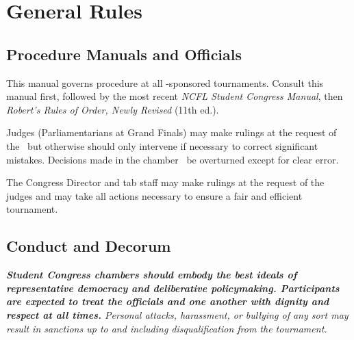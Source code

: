 \section{General Rules}


\subsection{Procedure Manuals and Officials}\label{manuals}

This manual governs procedure at all \FGCCFL-sponsored tournaments. 
Consult this manual first, 
followed by the most recent \emph{NCFL Student Congress Manual}, 
then \emph{Robert's Rules of Order, Newly Revised} (11th ed.).

Judges (Parliamentarians at Grand Finals) may make rulings at the request of the \po\ 
but otherwise should only intervene if necessary to correct significant mistakes. 
Decisions made in the chamber \willnot\ be overturned except for clear error.

The Congress Director and tab staff may make rulings at the request of the judges 
and may take all actions necessary to ensure a fair and efficient tournament.


\subsection{Conduct and Decorum}\label{conduct}

\textit{\textbf{Student Congress chambers should embody the best ideals of 
representative democracy and deliberative policymaking. 
Participants are expected to treat the officials and one another 
with dignity and respect at all times.} 
Personal attacks, harassment, or bullying of any sort may result in sanctions 
up to and including disqualification from the tournament.}

